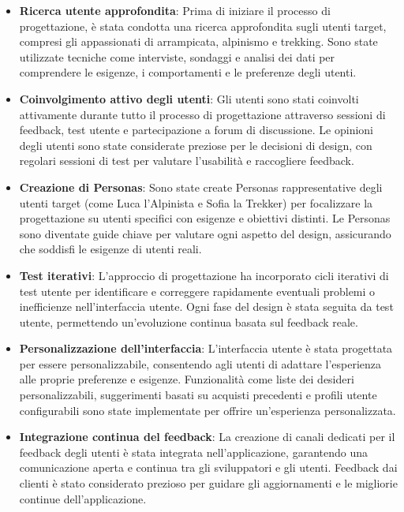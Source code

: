 \documentclass[12pt,a4paper,openright,twoside]{book}
\begin{document}


\begin{itemize}
    \item \textbf{Ricerca utente approfondita}: Prima di iniziare il processo di progettazione, è stata condotta una ricerca approfondita sugli utenti target, compresi gli appassionati di arrampicata, alpinismo e trekking. Sono state utilizzate tecniche come interviste, sondaggi e analisi dei dati per comprendere le esigenze, i comportamenti e le preferenze degli utenti.
    \item \textbf{Coinvolgimento attivo degli utenti}: Gli utenti sono stati coinvolti attivamente durante tutto il processo di progettazione attraverso sessioni di feedback, test utente e partecipazione a forum di discussione. Le opinioni degli utenti sono state considerate preziose per le decisioni di design, con regolari sessioni di test per valutare l'usabilità e raccogliere feedback.
    \item \textbf{Creazione di Personas}: Sono state create Personas rappresentative degli utenti target (come Luca l'Alpinista e Sofia la Trekker) per focalizzare la progettazione su utenti specifici con esigenze e obiettivi distinti. Le Personas sono diventate guide chiave per valutare ogni aspetto del design, assicurando che soddisfi le esigenze di utenti reali.
    \item \textbf{Test iterativi}: L'approccio di progettazione ha incorporato cicli iterativi di test utente per identificare e correggere rapidamente eventuali problemi o inefficienze nell'interfaccia utente. Ogni fase del design è stata seguita da test utente, permettendo un'evoluzione continua basata sul feedback reale.
    \item \textbf{Personalizzazione dell'interfaccia}: L'interfaccia utente è stata progettata per essere personalizzabile, consentendo agli utenti di adattare l'esperienza alle proprie preferenze e esigenze. Funzionalità come liste dei desideri personalizzabili, suggerimenti basati su acquisti precedenti e profili utente configurabili sono state implementate per offrire un'esperienza personalizzata.
    \item \textbf{Integrazione continua del feedback}: La creazione di canali dedicati per il feedback degli utenti è stata integrata nell'applicazione, garantendo una comunicazione aperta e continua tra gli sviluppatori e gli utenti. Feedback dai clienti è stato considerato prezioso per guidare gli aggiornamenti e le migliorie continue dell'applicazione.

\end{itemize}
\end{document}
